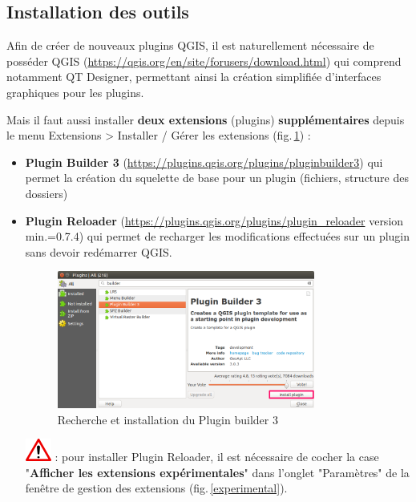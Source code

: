 \documentclass[11pt]{article}
\begin{document}
\subsection{Installation des outils}
\label{InstallationDesOutils}

Afin de créer de nouveaux plugins QGIS, il est naturellement nécessaire de posséder QGIS (\url{https://qgis.org/en/site/forusers/download.html}) qui comprend notamment QT Designer, permettant ainsi la création simplifiée d'interfaces graphiques pour les plugins. \vspace*{0.2em}

Mais il faut aussi installer \textbf{deux extensions} (plugins) \textbf{supplémentaires} depuis le menu \og{}Extensions\fg{} >{} \og{}Installer / Gérer les extensions\fg{} (fig.\,\ref{extensions}) : \vspace*{0.2em}

\begin{itemize}\itemsep0.2em
\renewcommand\labelitemi{\---}
\item \og{}\textbf{Plugin Builder 3}\fg{} (\url{https://plugins.qgis.org/plugins/pluginbuilder3}) qui permet la création du squelette de base pour un plugin (fichiers, structure des dossiers)
\item \og{}\textbf{Plugin Reloader}\fg{} (\url{https://plugins.qgis.org/plugins/plugin_reloader} version min.=0.7.4) qui permet de recharger les modifications effectuées sur un plugin sans devoir redémarrer QGIS.


\vspace*{-0.2em}
\begin{figure}[H]
	\centering
    \includegraphics[width=0.8\textwidth]{plugin_builder_install.png}
    \vspace*{-0.4em}
	\caption{Recherche et installation du \og{}Plugin builder 3\fg{}}
    \label{extensions}
\end{figure}


\includegraphics[scale=1]{warningt.png} \underline{}: pour installer \og{}Plugin Reloader\fg{}, il est nécessaire de cocher la case "\textbf{Afficher les extensions expérimentales}" dans l'onglet "Paramètres" de la fenêtre de gestion des extensions (fig.\,\ref{experimental}).
\end{itemize} 
\vspace{1em}
\end{document}
